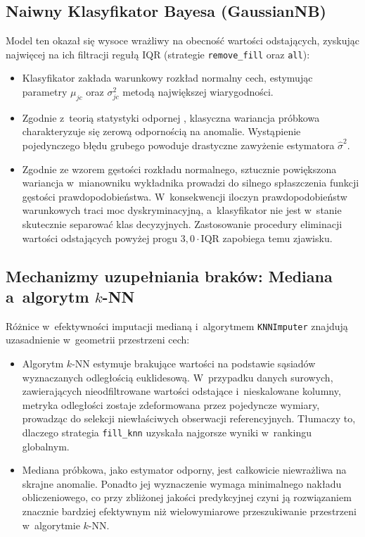 \subsection{Naiwny Klasyfikator Bayesa (GaussianNB)}
Model ten okazał się wysoce wrażliwy na obecność wartości odstających, zyskując najwięcej na ich filtracji regułą IQR (strategie \texttt{remove\_fill} oraz \texttt{all}):
\begin{itemize}
    \item Klasyfikator zakłada warunkowy rozkład normalny cech, estymując parametry $\mu_{jc}$ oraz $\sigma_{jc}^2$ metodą największej wiarygodności.
    \item Zgodnie z~teorią statystyki odpornej \cite{Huber1981}, klasyczna wariancja próbkowa charakteryzuje się zerową odpornością na anomalie. Wystąpienie pojedynczego błędu grubego powoduje drastyczne zawyżenie estymatora $\hat{\sigma}^2$.
    \item Zgodnie ze wzorem gęstości rozkładu normalnego, sztucznie powiększona wariancja w~mianowniku wykładnika prowadzi do silnego spłaszczenia funkcji gęstości prawdopodobieństwa. W~konsekwencji iloczyn prawdopodobieństw warunkowych traci moc dyskryminacyjną, a~klasyfikator nie jest w~stanie skutecznie separować klas decyzyjnych. Zastosowanie procedury eliminacji wartości odstających powyżej progu $3{,}0 \cdot \mathrm{IQR}$ \cite{Tukey1977} zapobiega temu zjawisku.
\end{itemize}

\subsection{Mechanizmy uzupełniania braków: Mediana a~algorytm $k$-NN}
Różnice w~efektywności imputacji medianą i~algorytmem \texttt{KNNImputer} znajdują uzasadnienie w~geometrii przestrzeni cech:
\begin{itemize}
    \item Algorytm $k$-NN estymuje brakujące wartości na podstawie sąsiadów wyznaczanych odległością euklidesową. W~przypadku danych surowych, zawierających nieodfiltrowane wartości odstające i~nieskalowane kolumny, metryka odległości zostaje zdeformowana przez pojedyncze wymiary, prowadząc do selekcji niewłaściwych obserwacji referencyjnych. Tłumaczy to, dlaczego strategia \texttt{fill\_knn} uzyskała najgorsze wyniki w~rankingu globalnym.
    \item Mediana próbkowa, jako estymator odporny, jest całkowicie niewrażliwa na skrajne anomalie. Ponadto jej wyznaczenie wymaga minimalnego nakładu obliczeniowego, co przy zbliżonej jakości predykcyjnej czyni ją rozwiązaniem znacznie bardziej efektywnym niż wielowymiarowe przeszukiwanie przestrzeni w~algorytmie $k$-NN.
\end{itemize}


